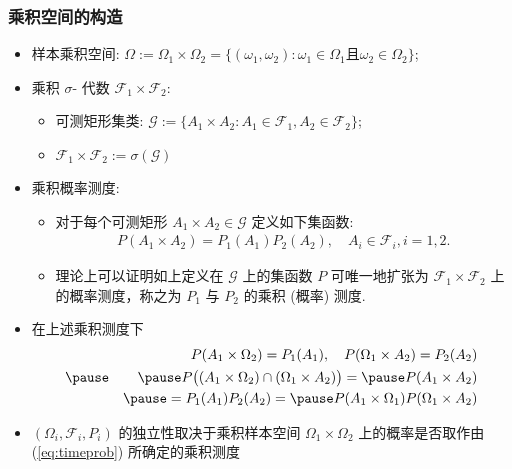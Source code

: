 \begin{frame}
  \frametitle{乘积空间的构造}
  \begin{itemize}[<+-|alert@+>]
  \item 样本乘积空间: $\Omega:=\Omega_1\times \Omega_2=\{(\omega_1,\omega_2):\omega_1\in\Omega_1\mbox{且}\omega_2\in \Omega_2\}$;
  \item 乘积 $\sigma$- 代数 $\mathcal{F}_1\times\mathcal{F}_2$:
    \begin{itemize}[<+-|alert@+>]
    \item 可测矩形集类: $\mathcal{G}:=\{A_1\times A_2: A_1\in\mathcal{F}_1, A_2\in \mathcal{F}_2\}$;
    \item $\mathcal{F}_1\times \mathcal{F}_2:=\sigma(\mathcal{G})$
    \end{itemize}
  \item 乘积概率测度:
    \begin{itemize}[<+-|alert@+>]
    \item 对于每个可测矩形 $A_1\times A_2\in \mathcal{G}$ 定义如下集函数:
      \begin{eqnarray}\label{eq:timeprob}
        P(A_1\times A_2)=P_1(A_1)P_2(A_2), \quad A_i\in\mathcal{F}_i, i=1,2.
      \end{eqnarray}
    \item 理论上可以证明如上定义在 $\mathcal{G}$ 上的集函数 $P$ 可唯一地扩张为 $\mathcal{F}_1\times\mathcal{F}_2$ 上的概率测度，称之为 $P_1$ 与 $P_2$ 的乘积 (概率) 测度.
    \end{itemize}
  \item 在上述乘积测度下
    \begin{eqnarray*}
      &&P(A_1\times \Omega_2)=P_1(A_1), \quad P(\Omega_1\times A_2)=P_2(A_2)\\\pause
      &&\pause P\big((A_1\times \Omega_2)\cap (\Omega_1\times A_2)\big)=\pause P(A_1\times A_2)\\
      &&\pause = P_1(A_1)P_2(A_2)=\pause P(A_1\times\Omega_1)P(\Omega_1\times A_2)
    \end{eqnarray*}
  \item $(\Omega_i,\mathcal{F}_i,P_i)$ 的独立性取决于乘积样本空间 $\Omega_1\times\Omega_2$ 上的概率是否取作由 (\ref{eq:timeprob}) 所确定的乘积测度
  \end{itemize}
\end{frame}
